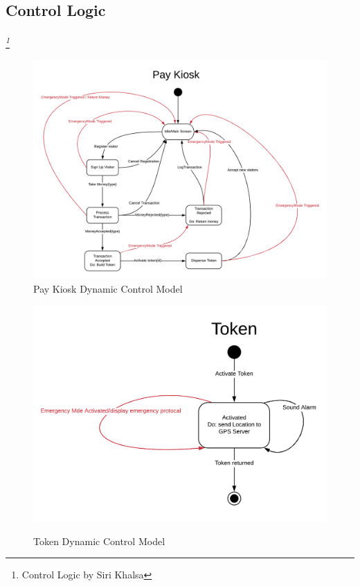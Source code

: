 \documentclass[12pt]{article}
\begin{document}
    \subsection{Control Logic} \label{logic}%
	\paragraph{} \textit{ \footnote{Control Logic by Siri Khalsa}}

    \begin{figure}[H]
 		\centerline{\includegraphics[scale=0.2]{PayKiosk.png}}
 		\caption{Pay Kiosk Dynamic Control Model}
  		\label{fig:normal}
    \end{figure}

    \begin{figure}[H]
 		{\includegraphics[scale=0.2]{Token.png}}
 		\caption{Token Dynamic Control Model}
  		\label{fig:normal}
    \end{figure}
\end{document}
